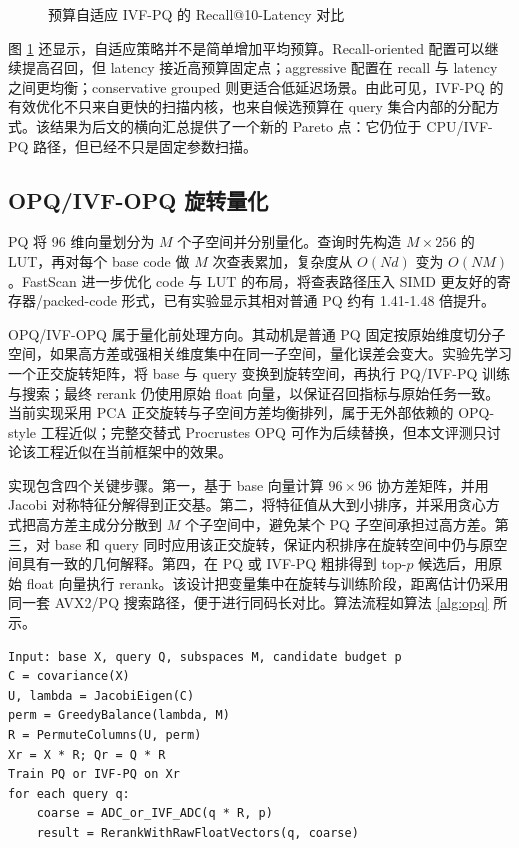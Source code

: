 \documentclass[a4paper,11pt,UTF8]{ctexart}
\begin{document}
\begin{figure}[H]
  \centering
  \resizebox{0.78\textwidth}{!}{}
  \caption{预算自适应 IVF-PQ 的 Recall@10-Latency 对比}
  \label{fig:adaptive-ivfpq}
\end{figure}

图 \ref{fig:adaptive-ivfpq} 还显示，自适应策略并不是简单增加平均预算。Recall-oriented 配置可以继续提高召回，但 latency 接近高预算固定点；aggressive 配置在 recall 与 latency 之间更均衡；conservative grouped 则更适合低延迟场景。由此可见，IVF-PQ 的有效优化不只来自更快的扫描内核，也来自候选预算在 query 集合内部的分配方式。该结果为后文的横向汇总提供了一个新的 Pareto 点：它仍位于 CPU/IVF-PQ 路径，但已经不只是固定参数扫描。

\subsection{OPQ/IVF-OPQ 旋转量化}

PQ\cite{jegou2011pq} 将 96 维向量划分为 $M$ 个子空间并分别量化。查询时先构造 $M\times256$ 的 LUT，再对每个 base code 做 $M$ 次查表累加，复杂度从 $O(Nd)$ 变为 $O(NM)$。FastScan\cite{andre2017fastscan} 进一步优化 code 与 LUT 的布局，将查表路径压入 SIMD 更友好的寄存器/packed-code 形式，已有实验显示其相对普通 PQ 约有 1.41-1.48 倍提升。

OPQ/IVF-OPQ\cite{ge2013opq} 属于量化前处理方向。其动机是普通 PQ 固定按原始维度切分子空间，如果高方差或强相关维度集中在同一子空间，量化误差会变大。实验先学习一个正交旋转矩阵，将 base 与 query 变换到旋转空间，再执行 PQ/IVF-PQ 训练与搜索；最终 rerank 仍使用原始 float 向量，以保证召回指标与原始任务一致。当前实现采用 PCA 正交旋转与子空间方差均衡排列，属于无外部依赖的 OPQ-style 工程近似；完整交替式 Procrustes OPQ 可作为后续替换，但本文评测只讨论该工程近似在当前框架中的效果。

实现包含四个关键步骤。第一，基于 base 向量计算 $96\times96$ 协方差矩阵，并用 Jacobi 对称特征分解得到正交基。第二，将特征值从大到小排序，并采用贪心方式把高方差主成分分散到 $M$ 个子空间中，避免某个 PQ 子空间承担过高方差。第三，对 base 和 query 同时应用该正交旋转，保证内积排序在旋转空间中仍与原空间具有一致的几何解释。第四，在 PQ 或 IVF-PQ 粗排得到 top-$p$ 候选后，用原始 float 向量执行 rerank。该设计把变量集中在旋转与训练阶段，距离估计仍采用同一套 AVX2/PQ 搜索路径，便于进行同码长对比。算法流程如算法 \ref{alg:opq} 所示。

\begin{lstlisting}[caption={OPQ-style rotation + PQ/IVF-PQ search},label={alg:opq},basicstyle=\ttfamily\scriptsize]
Input: base X, query Q, subspaces M, candidate budget p
C = covariance(X)
U, lambda = JacobiEigen(C)
perm = GreedyBalance(lambda, M)
R = PermuteColumns(U, perm)
Xr = X * R; Qr = Q * R
Train PQ or IVF-PQ on Xr
for each query q:
    coarse = ADC_or_IVF_ADC(q * R, p)
    result = RerankWithRawFloatVectors(q, coarse)
\end{lstlisting}
\end{document}
